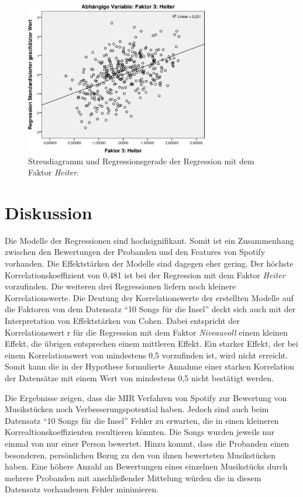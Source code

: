 \begin{figure}[hbt]
    \begin{center}
        \includegraphics[width=8cm]{images/StreudiagrammFak3.pdf}
    \end{center}
    \caption{Streudiagramm und Regressionsgerade der Regression mit dem Faktor \textit{Heiter}.}
    \label{fig:Faktor3}
\end{figure}

\section*{Diskussion}
\label{sec:Diskussion}


Die Modelle der Regressionen sind hochsignifikant.
Somit ist ein Zusammenhang zwischen den Bewertungen der Probanden und den Features von Spotify vorhanden.
Die Effektstärken der Modelle sind dagegen eher gering. 
Der höchste Korrelationskoeffizient von 0,481 ist bei der Regression mit dem Faktor \textit{Heiter} vorzufinden. Die weiteren drei Regressionen liefern noch kleinere Korrelationswerte.
Die Deutung der Korrelationswerte der erstellten Modelle auf die Faktoren von dem Datensatz ``10 Songs für die Insel'' deckt sich auch mit der Interpretation von Effektstärken von Cohen.
Dabei entspricht der Korrelationswert r für die Regression mit dem Faktor \textit{Niveauvoll} einem kleinen Effekt, die übrigen entsprechen einem mittleren Effekt. Ein starker Effekt, der bei einem Korrelationswert von mindestens 0,5 vorzufinden ist, wird nicht erreicht.
Somit kann die in der Hypothese formulierte Annahme einer starken Korrelation der Datensätze mit einem Wert von mindestens 0,5 nicht bestätigt werden. 

Die Ergebnisse zeigen, dass die MIR Verfahren von Spotify zur Bewertung von Musikstücken noch Verbesserungspotential haben.
Jedoch sind auch beim Datensatz ``10 Songs für die Insel'' Fehler zu erwarten, die in einen kleineren Korrealtionskoeffizienten resultieren könnten.
Die Songs wurden jeweils nur einmal von nur einer Person bewertet.
Hinzu kommt, dass die Probanden einen besonderen, persönlichen Bezug zu den von ihnen bewerteten Musikstücken haben.
Eine höhere Anzahl an Bewertungen eines einzelnen Musikstücks durch mehrere Probanden mit anschließender Mittelung würden die in diesem Datensatz vorhandenen Fehler minimieren.

